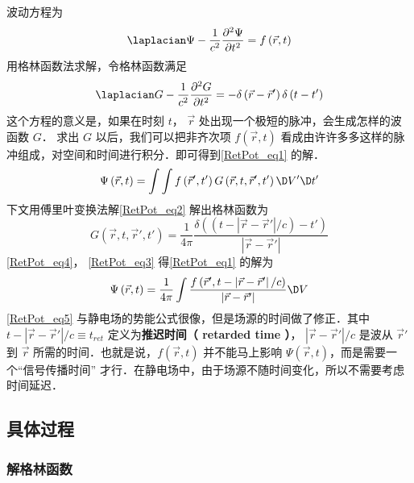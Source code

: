 
波动方程为
\begin{equation}\label{RetPot_eq1}
{\laplacian}\Psi  - \frac{1}{{{c^2}}}\frac{{{\partial ^2}\Psi }}{{\partial {t^2}}} = f\left( {\vec r,t} \right)
\end{equation} 
用格林函数法求解，令格林函数满足
\begin{equation}\label{RetPot_eq2}
{\laplacian}G - \frac{1}{{{c^2}}}\frac{{{\partial ^2}G}}{{\partial {t^2}}} =  - \delta \left( {\vec r - \vec r'} \right)\delta \left( {t - t'} \right)
\end{equation} 
这个方程的意义是，如果在时刻 $t$， $\vec r$ 处出现一个极短的脉冲，会生成怎样的波函数 $G$． 求出 $G$ 以后，我们可以把非齐次项 $f\left( {\vec r,t} \right)$ 看成由许许多多这样的脉冲组成，对空间和时间进行积分．即可得到\autoref{RetPot_eq1} 的解．
\begin{equation}\label{RetPot_eq3}
\Psi \left( {\vec r,t} \right) = \int {\int {f\left( {\vec r',t'} \right)G\left( {\vec r,t,\vec r',t'} \right)\D V'} \D t'} 
\end{equation} 
下文用傅里叶变换法解\autoref{RetPot_eq2} 解出格林函数为
\begin{equation}\label{RetPot_eq4}
G\left( {\vec r,t,\vec r',t'} \right) = \frac{1}{{4\pi }}\frac{{\delta \left( {\left( {t - \left| {\vec r - \vec r'} \right|/c} \right) - t'} \right)}}{{\left| {\vec r - \vec r'} \right|}}
\end{equation} 
\autoref{RetPot_eq4}， \autoref{RetPot_eq3} 得\autoref{RetPot_eq1} 的解为
\begin{equation}\label{RetPot_eq5}
\Psi \left( {\vec r,t} \right) = \frac{1}{{4\pi }}\int {\frac{{f\left( {\vec r',t - \left| {\vec r - \vec r'} \right|/c} \right)}}{{\left| {\vec r - \vec r'} \right|}}\D V} 
\end{equation} 
\autoref{RetPot_eq5} 与静电场的势能公式很像，但是场源的时间做了修正．其中 $t - \left| {\vec r - \vec r'} \right|/c \equiv {t_{ret}}$ 定义为\textbf{推迟时间（ retarded time ）}， $\left| {\vec r - \vec r'} \right|/c$ 是波从 $\vec r'$ 到 $\vec r$ 所需的时间．也就是说，$f\left( {\vec r,t} \right)$ 并不能马上影响 $\Psi \left( {\vec r,t} \right)$，而是需要一个“信号传播时间” 才行．在静电场中，由于场源不随时间变化，所以不需要考虑时间延迟．

\subsection{具体过程}

\subsubsection{解格林函数}  


